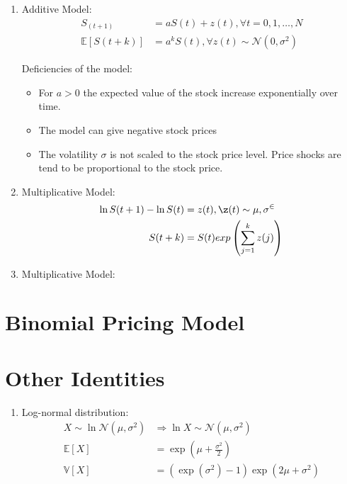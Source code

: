 \documentclass[12pt,twoside]{article}
\begin{document}
\begin{enumerate}
	\item Additive Model:
		\begin{align*}
			S_(t+1)	 &= a S(t) + z(t), \forall t=0,1,\ldots, N\\
			\mathbb{E}\left[S(t+k) \right] & = a^kS(t), \forall z(t) \sim \mathcal{N} (0, \sigma^2)
		\end{align*}			
		
		Deficiencies of the model:
		\begin{itemize}
			\item For $a>0$ the expected value of the stock increase exponentially over time.
			\item The model can give negative stock prices
			\item The volatility $\sigma$ is not scaled to the stock price level. Price shocks are tend to be proportional to the stock price.
		\end{itemize}
	
	\item Multiplicative Model:
		\begin{align*}
			\ln S(t+1) - \ln S(t) 	& = z(t), \z(t)\sim \mathcal{\mu, \sigma^2} \\
			S(t+k) 						& = S(t) exp\left(\sum_{j=1}^k z(j)\right)
		\end{align*}
	
	\item Multiplicative Model:



\end{enumerate}





\section{Binomial Pricing Model}



\section{Other Identities}
\begin{enumerate}
	\item Log-normal distribution: 
	\begin{align*}
		X \sim \ln \mathcal{N}(\mu, \sigma^2) & \Rightarrow \ln X \sim \mathcal{N}(\mu, \sigma^2) \\
		\mathbb{E}[X] 	& = \exp\left(\mu+ \frac{\sigma^2}{2} \right)\\
		\mathbb{V}[X] 	& =\left(\exp(\sigma^2) - 1\right) \exp\left(2\mu+ \sigma^2 \right)
	\end{align*}

\end{enumerate}
\end{document}
